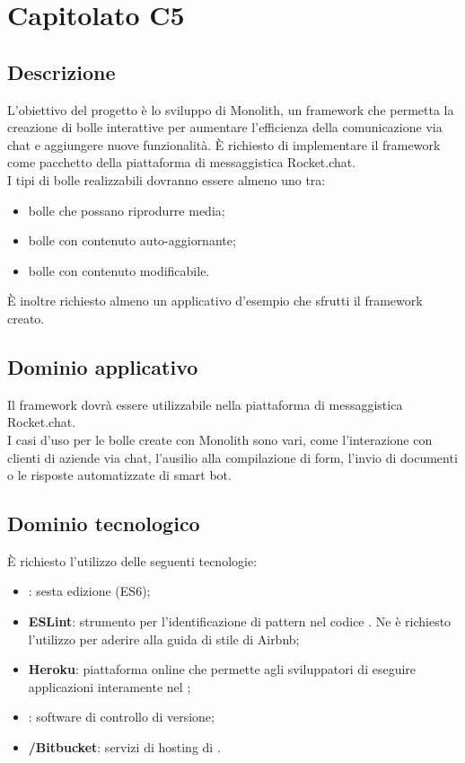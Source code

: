
\section {Capitolato C5}


\subsection {Descrizione}
L’obiettivo del progetto è lo sviluppo di Monolith, un framework che permetta la creazione di bolle interattive per aumentare l’efficienza della comunicazione via chat e aggiungere nuove funzionalità. È richiesto di implementare il framework come pacchetto della piattaforma di messaggistica Rocket.chat. \\
I tipi di bolle realizzabili dovranno essere almeno uno tra:
\begin{itemize}
	\item bolle che possano riprodurre media;
	\item bolle con contenuto auto-aggiornante;
	\item bolle con contenuto modificabile.
\end{itemize}
È inoltre richiesto almeno un applicativo d'esempio che sfrutti il framework creato.


\subsection {Dominio applicativo}
Il framework dovrà essere utilizzabile nella piattaforma di messaggistica Rocket.chat. \\
I casi d'uso per le bolle create con Monolith sono vari, come l'interazione con clienti di aziende via chat, l'ausilio alla compilazione di form, l'invio di documenti o le risposte automatizzate di smart bot.


\subsection {Dominio tecnologico}
È richiesto l’utilizzo delle seguenti tecnologie:
\begin{itemize}
	\item \textbf{}: sesta edizione (ES6);
	\item \textbf{ESLint}: strumento per l’identificazione di pattern nel codice . Ne è richiesto l'utilizzo per aderire alla guida di stile  di Airbnb;
	\item \textbf{Heroku}: piattaforma online che permette agli sviluppatori di eseguire applicazioni interamente nel ;
	\item \textbf{}: software di controllo di versione;
	\item \textbf{/Bitbucket}: servizi di hosting di  .
\end{itemize}

